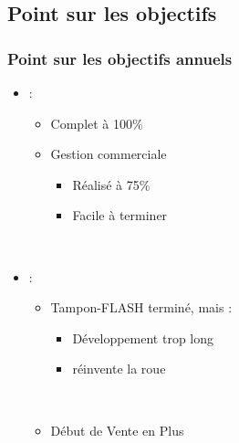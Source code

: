 \subsection{Point sur les objectifs}

\begin{frame}
	\frametitle{Point sur les objectifs annuels}

	\begin{itemize}
		\item \solulog{} :
			\begin{itemize}
				\item Complet à 100\%\sautligne

				\item Gestion commerciale
					\begin{itemize}
						\item Réalisé à 75\%
						\item Facile à terminer
					\end{itemize}
			\end{itemize}~

		\item \fidit{} :
			\begin{itemize}
				\item Tampon-FLASH terminé, mais :
					\begin{itemize}
						\item Développement trop long
						\item \og réinvente la roue \fg
					\end{itemize}~

				\item Début de Vente en Plus
			\end{itemize}
	\end{itemize}
\end{frame}
